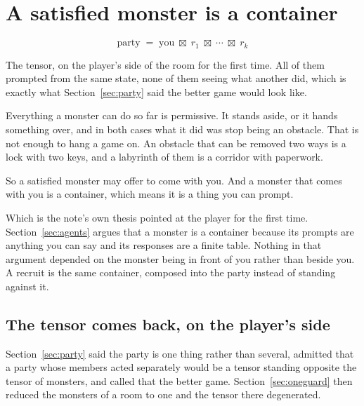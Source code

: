 \documentclass[11pt,a4paper]{article}
\begin{document}
\section{A satisfied monster is a container}
\label{sec:recruit}

\begin{center}
\begin{tcolorbox}[plainbg, colback=pale, width=0.86\textwidth]
\[ \text{party} \;=\; \text{you} \;\boxtimes\; r_1 \;\boxtimes\; \cdots \;\boxtimes\; r_k \]
\end{tcolorbox}
\end{center}

The tensor, on the player's side of the room for the first time. All of them prompted from the same
state, none of them seeing what another did, which is exactly what Section~\ref{sec:party} said the
better game would look like.


Everything a monster can do so far is permissive. It stands aside, or it hands something over, and
in both cases what it did was stop being an obstacle. That is not enough to hang a game on. An
obstacle that can be removed two ways is a lock with two keys, and a labyrinth of them is a
corridor with paperwork.

So a satisfied monster may offer to come with you. And a monster that comes with you is a
container, which means it is a thing you can prompt.

\begin{sectionbox}
Which is the note's own thesis pointed at the player for the first time. Section~\ref{sec:agents}
argues that a monster is a container because its prompts are anything you can say and its
responses are a finite table. Nothing in that argument depended on the monster being in front of
you rather than beside you. A recruit is the same container, composed into the party instead of
standing against it.
\end{sectionbox}

\subsection{The tensor comes back, on the player's side}

Section~\ref{sec:party} said the party is one thing rather than several, admitted that a party
whose members acted separately would be a tensor standing opposite the tensor of monsters, and
called that the better game. Section~\ref{sec:oneguard} then reduced the monsters of a room to one
and the tensor there degenerated.
\end{document}
